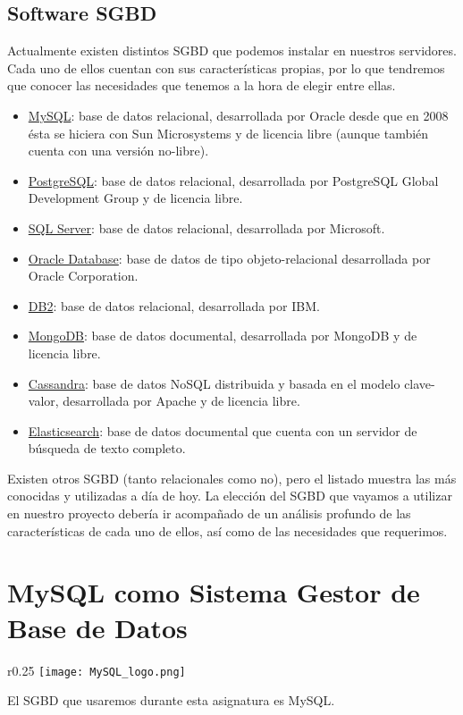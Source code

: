 \section{Software SGBD}
Actualmente existen distintos SGBD que podemos instalar en nuestros servidores. Cada uno de ellos cuentan con sus características propias, por lo que tendremos que conocer las necesidades que tenemos a la hora de elegir entre ellas.

\begin{itemize}
    \item \href{https://es.wikipedia.org/wiki/MySQL}{MySQL}: base de datos relacional, desarrollada por Oracle desde que en 2008 ésta se hiciera con Sun Microsystems y de licencia libre (aunque también cuenta con una versión no-libre).
    \item \href{https://es.wikipedia.org/wiki/PostgreSQL}{PostgreSQL}: base de datos relacional, desarrollada por PostgreSQL Global Development Group y de licencia libre.
    \item \href{https://es.wikipedia.org/wiki/Microsoft_SQL_Server}{SQL Server}: base de datos relacional, desarrollada por Microsoft.
    \item \href{https://es.wikipedia.org/wiki/Oracle_Database}{Oracle Database}: base de datos de tipo objeto-relacional desarrollada por Oracle Corporation.
    \item \href{https://en.wikipedia.org/wiki/IBM_Db2_Family}{DB2}: base de datos relacional, desarrollada por IBM.
    \item \href{https://es.wikipedia.org/wiki/MongoDB}{MongoDB}: base de datos documental, desarrollada por MongoDB y de licencia libre.
    \item \href{https://es.wikipedia.org/wiki/Apache_Cassandra}{Cassandra}: base de datos NoSQL distribuida y basada en el modelo clave-valor, desarrollada por Apache y de licencia libre.
    \item \href{https://es.wikipedia.org/wiki/Elasticsearch}{Elasticsearch}: base de datos documental que cuenta con un servidor de búsqueda de texto completo.
\end{itemize}

Existen otros SGBD (tanto relacionales como no), pero el listado muestra las más conocidas y utilizadas a día de hoy. La elección del SGBD que vayamos a utilizar en nuestro proyecto debería ir acompañado de un análisis profundo de las características de cada uno de ellos, así como de las necesidades que requerimos.


\chapter{MySQL como Sistema Gestor de Base de Datos}
\begin{wrapfigure}{r}{0.25\linewidth}
    \centering
    \vspace{-20pt}
    \texttt{[image: MySQL\_logo.png]}
    \vspace{-60pt}
\end{wrapfigure}
El SGBD que usaremos durante esta asignatura es MySQL.


